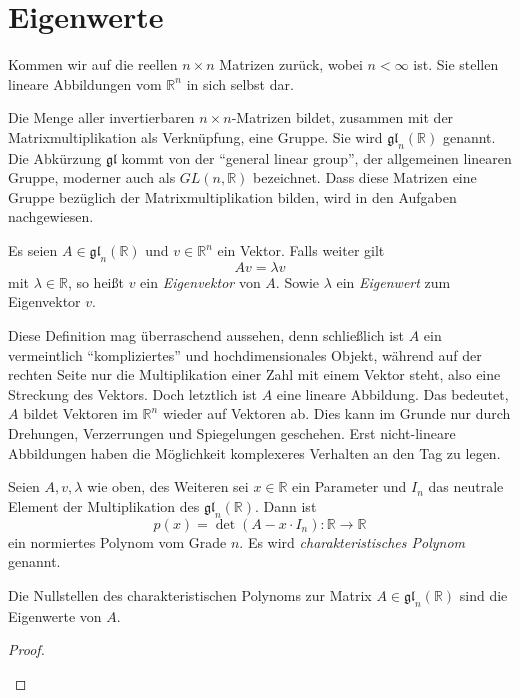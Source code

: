 


\chapter{Eigenwerte}

Kommen wir auf die reellen $n\times n$ Matrizen zurück, wobei $n<\infty$ ist. Sie stellen lineare Abbildungen vom $\mathbb{R}^n$ in sich selbst dar. 
\begin{definition}
Die Menge aller invertierbaren $n\times n$-Matrizen bildet, zusammen mit der Matrixmultiplikation als Verknüpfung, eine Gruppe. Sie wird $\mathfrak{gl}_n(\mathbb{R})$ genannt. Die Abkürzung $\mathfrak{gl}$ kommt von der "`general linear group"', der allgemeinen linearen Gruppe, moderner auch als $GL(n,\mathbb{R})$ bezeichnet. Dass diese Matrizen eine Gruppe bezüglich der Matrixmultiplikation bilden, wird in den Aufgaben nachgewiesen.
\end{definition}


\begin{definition}
Es seien $A\in \mathfrak{gl}_n(\mathbb{R})$ und $v\in \mathbb{R}^n$ ein Vektor. Falls weiter gilt
\[
Av = \lambda v
\]
mit $\lambda\in \mathbb{R}$, so heißt $v$ ein \emph{Eigenvektor} von $A$. Sowie $\lambda$ ein \emph{Eigenwert} zum Eigenvektor $v$.
\end{definition}

Diese Definition mag überraschend aussehen, denn schließlich ist $A$ ein vermeintlich "`kompliziertes"' und hochdimensionales Objekt, während auf der rechten Seite nur die Multiplikation einer Zahl mit einem Vektor steht, also eine Streckung des Vektors. Doch letztlich ist $A$ eine lineare Abbildung. Das bedeutet, $A$ bildet Vektoren im $\mathbb{R}^n$ wieder auf Vektoren ab. Dies kann im Grunde nur durch Drehungen, Verzerrungen und Spiegelungen geschehen. Erst nicht-lineare Abbildungen haben die Möglichkeit komplexeres Verhalten an den Tag zu legen. 

\begin{definition}
Seien $A,v,\lambda$ wie oben, des Weiteren sei $x\in \mathbb{R}$ ein Parameter und $I_n$ das neutrale Element der Multiplikation des $\mathfrak{gl}_n(\mathbb{R})$. Dann ist 
\[
p(x) = \det(A-x\cdot I_n) : \mathbb{R} \longrightarrow \mathbb{R}
\]
ein normiertes Polynom vom Grade $n$. Es wird \emph{charakteristisches Polynom} genannt.
\end{definition}

\begin{theorem}
Die Nullstellen des charakteristischen Polynoms zur Matrix $A\in \mathfrak{gl}_n(\mathbb{R})$ sind die Eigenwerte von $A$.
\end{theorem}
\begin{proof}
\begin{TODO}

\end{TODO}
\end{proof}

